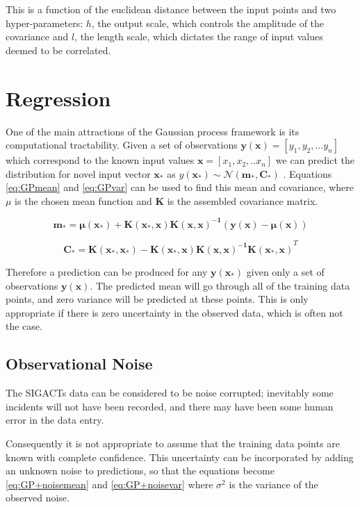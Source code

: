 \documentclass[a4paper,11pt]{report}
\begin{document}
This is a function of the euclidean distance between the input points and two hyper-parameters: \(h\), the output scale, which controls the amplitude of the covariance and \(l\), the length scale, which dictates the range of input values deemed to be correlated. 

\section{Regression}

One of the main attractions of the Gaussian process framework is its computational tractability. Given a set of observations \( \mathbf{y}( \mathbf{x} ) = [y_1, y_2, ... y_n] \) which correspond to the known input values \( \mathbf{x} = [x_1, x_2, .. x_n] \) we can predict the distribution for novel input vector \( \mathbf{x_*} \) as \( y( \mathbf{x_*}) \sim \mathcal{N}(\mathbf{m_*,C_*}) \) \cite{GP-robots}. Equations \ref{eq:GPmean} and \ref{eq:GPvar} can be used to find this mean and covariance, where \(\mu\) is the chosen mean function and \(\mathbf{K}\) is the assembled covariance matrix.

\singlespacing

\begin{equation} \label{eq:GPmean}
\mathbf{m_* = \mu (x_*) + K(x_* ,x) K(x,x)^{-1} (y(x) - \mu (x))}
\end{equation}

\begin{equation} \label{eq:GPvar}
\mathbf{C_* = K(x_*,x_*)-K(x_*,x) K(x,x)^{-1} K(x_*,x)}^{T}
\end{equation}

\doublespacing

Therefore a prediction can be produced for any \(\mathbf{y(x_*)}\) given only a set of observations \(\mathbf{y(x)}\). The predicted mean will go through all of the training data points, and zero variance will be predicted at these points. This is only appropriate if there is zero uncertainty in the observed data, which is often not the case.

\subsection{Observational Noise}

The SIGACTs data can be considered to be noise corrupted; inevitably some incidents will not have been recorded, and there may have been some human error in the data entry. 

Consequently it is not appropriate to assume that the training data points are known with complete confidence. This uncertainty can be incorporated by adding an unknown noise to predictions, so that the equations become \ref{eq:GP+noisemean} and \ref{eq:GP+noisevar} where \( \sigma^2 \) is the variance of the observed noise.
\end{document}
